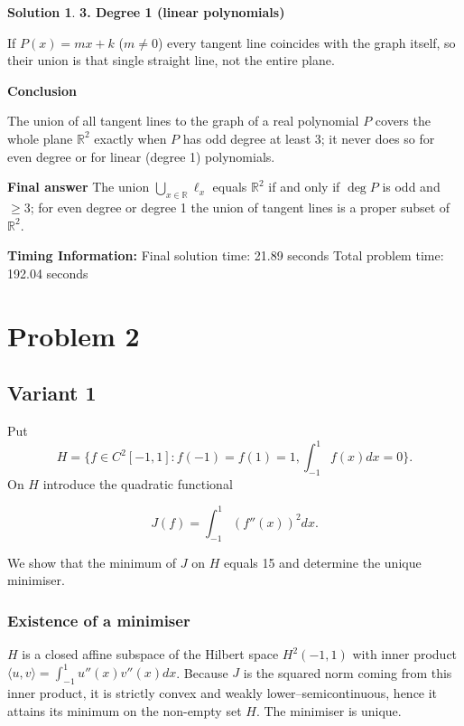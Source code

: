 \documentclass[12pt,a4paper]{article}
\theoremstyle{definition}
\newtheorem{solution}{Solution}
\begin{document}
\begin{solution}
        \textbf{3. Degree 1 (linear polynomials)}

        If $P(x)=mx+k$ ($m\neq0$) every tangent line coincides with the graph itself, so their union is that single straight line, not the entire plane.

        \textbf{Conclusion}

        The union of all tangent lines to the graph of a real polynomial $P$ covers the whole plane $\mathbb{R}^2$ exactly when $P$ has odd degree at least 3; it never does so for even degree or for linear (degree 1) polynomials.

        \textbf{Final answer} The union $\bigcup_{x\in\mathbb{R}}\ell_x$ equals $\mathbb{R}^2$ if and only if $\deg P$ is odd and $\geq3$; for even degree or degree 1 the union of tangent lines is a proper subset of $\mathbb{R}^2$.
    \end{solution}

    \textbf{Timing Information:}
    Final solution time: 21.89 seconds
    Total problem time: 192.04 seconds

    \newpage

    \section{Problem 2}

    \subsection{Variant 1}
        Put
        $$H = \{f \in C^2[-1,1] : f(-1) = f(1) = 1, \int_{-1}^{1} f(x)dx = 0\}.$$
        On $H$ introduce the quadratic functional

        $$J(f) = \int_{-1}^{1} (f''(x))^2 dx.$$

        We show that the minimum of $J$ on $H$ equals 15 and determine the unique minimiser.


        \subsubsection*{Existence of a minimiser}

        $H$ is a closed affine subspace of the Hilbert space $H^2(-1,1)$ with inner product $\langle u,v \rangle = \int_{-1}^{1} u''(x)v''(x)dx$.
        Because $J$ is the squared norm coming from this inner product, it is strictly convex and weakly lower--semicontinuous, hence it attains its minimum on the non-empty set $H$. The minimiser is unique.
\end{document}
